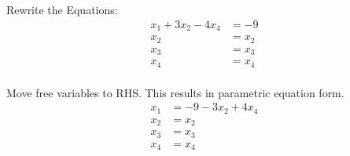 \noindent
\newline
Rewrite the Equations:
\begin{align}
    x_1 + 3x_2 -4x_4 &= -9 \\
    x_2 &= x_2 \\
    x_3 &= x_3 \\
    x_4 &= x_4 \\
\end{align}

\noindent
\newline
Move free variables to RHS. This results in parametric equation form.
\begin{align}
    x_1 &= -9 - 3x_2 + 4 x_4 \\
    x_2 &= x_2 \\
    x_3 &= x_3 \\
    x_4 &= x_4 \\
\end{align}

